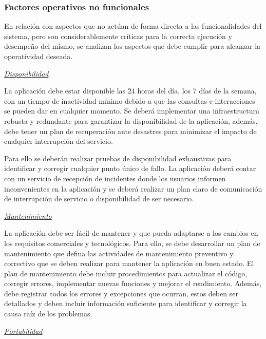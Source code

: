 \documentclass[a4paper,12pt]{article}
\begin{document}
    \subsubsection{Factores operativos no funcionales}
    \par En relación con aspectos que no actúan de forma directa a las funcionalidades del sistema, pero son considerablemente críticas para la correcta ejecución y desempeño del mismo, se analizan los aspectos que debe cumplir para alcanzar la operatividad deseada.
    \newline
    \par \noindent \textit{\underline{Disponibilidad}} 
    \newline
    \par La aplicación debe estar disponible las 24 horas del día, los 7 días de la semana, con un tiempo de inactividad mínimo debido a que las consultas e interacciones se pueden dar en cualquier momento. Se deberá implementar una infraestructura robusta y redundante para garantizar la disponibilidad de la aplicación, además, debe tener un plan de recuperación ante desastres para minimizar el impacto de cualquier interrupción del servicio.
    \par Para ello se deberán realizar pruebas de disponibilidad exhaustivas para identificar y corregir cualquier punto único de fallo. La aplicación deberá contar con un servicio de recepción de incidentes donde los usuarios informen inconvenientes en la aplicación y se deberá realizar un plan claro de comunicación de interrupción de servicio o disponibilidad de ser necesario.
    \newline
    \par \noindent \textit{\underline{Mantenimiento}} 
    \newline
    \par La aplicación debe ser fácil de mantener y que pueda adaptarse a los cambios en los requisitos comerciales y tecnológicos. Para ello, se debe desarrollar un plan de mantenimiento que defina las actividades de mantenimiento preventivo y correctivo que se deben realizar para mantener la aplicación en buen estado. El plan de mantenimiento debe incluir procedimientos para actualizar el código, corregir errores, implementar nuevas funciones y mejorar el rendimiento. Además, debe registrar todos los errores y excepciones que ocurran, estos deben ser detallados y deben incluir información suficiente para identificar y corregir la causa raíz de los problemas.
    \newline
    \par \noindent \textit{\underline{Portabilidad}} 
\end{document}
